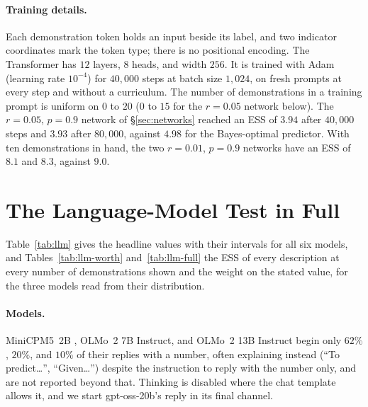 \documentclass{article}
\begin{document}
\paragraph{Training details.} Each demonstration token holds an input beside its label, and two indicator coordinates mark the token type; there is no positional encoding. The Transformer has $12$ layers, $8$ heads, and width $256$. It is trained with Adam (learning rate $10^{-4}$) for $40{,}000$ steps at batch size $1{,}024$, on fresh prompts at every step and without a curriculum. The number of demonstrations in a training prompt is uniform on $0$ to $20$ ($0$ to $15$ for the $r = 0.05$ network below). The $r = 0.05$, $p = 0.9$ network of \S\ref{sec:networks} reached an ESS of $3.94$ after $40{,}000$ steps and $3.93$ after $80{,}000$, against $4.98$ for the Bayes-optimal predictor. With ten demonstrations in hand, the two $r = 0.01$, $p = 0.9$ networks have an ESS of $8.1$ and $8.3$, against $9.0$.

\section{The Language-Model Test in Full}\label{app:llm}
Table~\ref{tab:llm} gives the headline values with their intervals for all six models, and Tables~\ref{tab:llm-worth} and~\ref{tab:llm-full} the ESS of every description at every number of demonstrations shown and the weight on the stated value, for the three models read from their distribution.

\paragraph{Models.} MiniCPM5~2B \citep{minicpm5}, OLMo~2 7B Instruct, and OLMo~2 13B Instruct begin only $62\%$, $20\%$, and $10\%$ of their replies with a number, often explaining instead (``To predict\ldots'', ``Given\ldots'') despite the instruction to reply with the number only, and are not reported beyond that. Thinking is disabled where the chat template allows it, and we start gpt-oss-20b's reply in its final channel.

\begin{table}[!htb]
\centering\small
\setlength{\tabcolsep}{2.4pt}
\caption{The ESS and the weight on the stated value for each model. Left: the ESS of a description (median over $n = 1$, $2$, and $4$ demonstrations shown) for a relevant description with $c = 1$, $4$, or $36$, and for the $c = 36$ description when irrelevant or with a stated $10\%$ or $50\%$ chance of being wrong. Brackets, $95\%$ bootstrap intervals; $\leq$, an upper bound, where one demonstration alone beats the description; $\sigma = 60$, $2{,}000$ tasks; ``written'': read from the number the model writes. Right: the weight on the stated value with one demonstration shown; the Bayes-optimal weight is $c/(c+n)$. The Bayes-optimal predictor takes a description as relevant unless a chance of being wrong is stated, and then hedges with that chance.}
\label{tab:llm}
\vspace{3pt}

\end{table}
\end{document}
